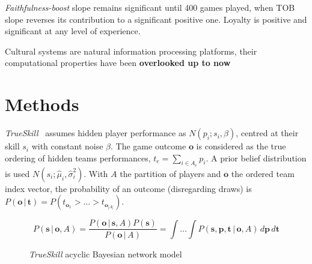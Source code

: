 \documentclass[a0,portrait]{a0poster}
\begin{document}
\begin{multicols}{2}
\begin{multicols}{2}
\columnbreak

\emph{Faithfulness-boost} slope remains significant until 400 games played, when TOB slope reverses its contribution to a significant positive one.
Loyalty is positive and significant at any level of experience.

\end{multicols}

\vspace{0.5cm}
\begin{mdframed}[backgroundcolor=gray!15] 
\Large \centering 
\vspace{0.5cm}

Cultural systems are natural information processing platforms, their computational properties have been \textbf{overlooked up to now}
% 
% 
% 
\vspace{0.5cm}
\end{mdframed}

\vspace{-1cm}
\section*{Methods}

\emph{TrueSkill}~\cite{herbrich2006-trueskill} assumes hidden player performance as $N(p_i;s_i , \beta)$, centred at their skill $s_i$ with constant noise $\beta$.
The game outcome $\bm{o}$ is considered as the true ordering of hidden teams performances, $t_e = \sum_{i\in A_e} p_i$.
A prior belief distribution is used $N(s_i; \widehat{\mu}_i,\widehat{\sigma}_i^2)$.
With $A$ the partition of players and $\bm{o}$ the ordered team index vector, the probability of an outcome (disregarding draws) is $P(\bm{o} \, | \, \bm{t}) = P(t_{\bm{o}_1} > \dots > t_{\bm{o}_{|A|}})$.

\begin{equation}
  P(\bm{s} \, | \, \bm{o}, A) =  \frac{P(\bm{o} \, | \, \bm{s}, A)  P(\bm{s})}{ P(\bm{o} \, | \, A)} = \int \dots \int P(\bm{s},\bm{p},\bm{t} \, | \, \bm{o}, A) \, d\bm{p}\, d\bm{t}
\end{equation}

\begin{figure}[H]
  \centering
  \scalebox{1}{}
  \caption{\small \emph{TrueSkill} acyclic Bayesian network model}
  \label{modelo_trueskill}
\end{figure}



\end{multicols}
\end{document}
